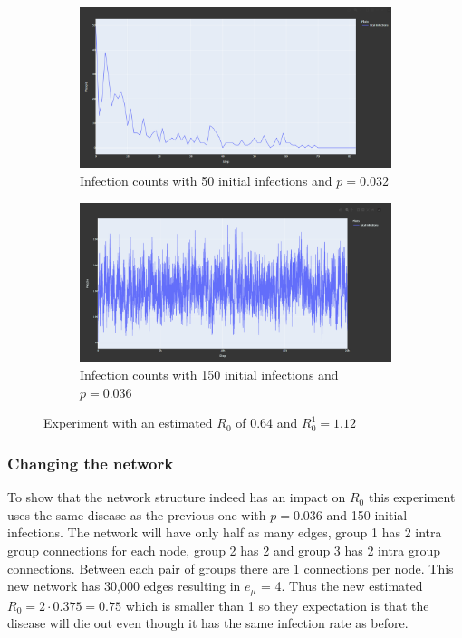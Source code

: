 \begin{figure}
    \centering
    \begin{subfigure}[b]{0.475\textwidth}
        \centering
        \includegraphics[width=\textwidth]{images/exp_big_r0_fail.png}
        \caption[Network2]%
        {{\small Infection counts with 50 initial infections and $p = 0.032$}}   
    \end{subfigure}
    \hfill
    \begin{subfigure}[b]{0.475\textwidth}  
        \centering 
        \includegraphics[width=\textwidth]{images/exp_big_r0_success.png}
        \caption[]%
        {{\small Infection counts with 150 initial infections and $p = 0.036$}}    
    \end{subfigure}
    \caption[Experiment with an estimated $R_0$ of 0.64 and $R_0^1 = 1.12$]
    {\small Experiment with an estimated $R_0$ of 0.64 and $R_0^1 = 1.12$} 
    \label{fig:exp_r0_big}
\end{figure}

\subsubsection{Changing the network}
To show that the network structure indeed has an impact on $R_0$ this experiment
uses the same disease as the previous one with $p=0.036$ and 150 initial infections.
The network will have only half as many
edges, group 1 has 2 intra group connections for each node, group 2 has 2 and
group 3 has 2 intra group connections. Between each pair of groups there are
1 connections per node. This new network has 30,000 edges resulting in $e_\mu$ = 4.
Thus the new estimated $R_0=2\cdot0.375=0.75$ which is smaller than 1 so they
expectation is that the disease will die out even though it has the same infection 
rate as before.

